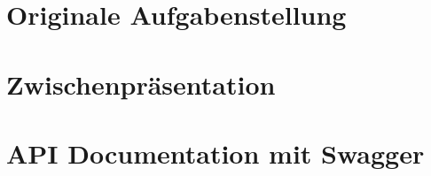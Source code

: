 \section{Originale Aufgabenstellung}\label{originaleaufgabenstellung}
%
\section{Zwischenpräsentation}\label{zwischenpraesentation}

\section{API Documentation mit Swagger}\label{SwaggerDokumentation}
%